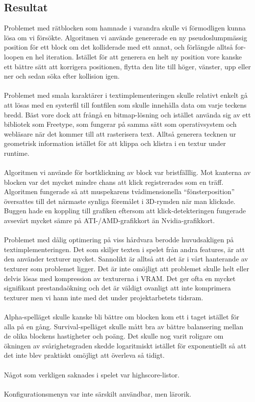 \documentclass[a4paper]{article}
\begin{document}
\subsection{Resultat}
Problemet med rätblocken som hamnade i varandra skulle vi förmodligen kunna lösa om vi försökte. Algoritmen vi använde genererade en ny pseudoslumpmässig position för ett block om det kolliderade med ett annat, och förlängde alltså for-loopen en hel iteration. Istället för att generera en helt ny position vore kanske ett bättre sätt att korrigera positionen, flytta den lite till höger, vänster, upp eller ner och sedan söka efter kollision igen.
\\
\\
Problemet med smala karaktärer i textimplementeringen skulle relativt enkelt gå att lösas med en systerfil till fontfilen som skulle innehålla data om varje teckens bredd. Bäst vore dock att frångå en bitmap-lösning och istället använda sig av ett bibliotek som Freetype, som fungerar på samma sätt som operativsystem och webläsare när det kommer till att rasterisera text. Alltså generera tecknen ur geometrisk information istället för att klippa och klistra i en textur under runtime.
\\
\\
Algoritmen vi använde för bortklickning av block var bristfälllig. Mot kanterna av blocken var det mycket mindre chans att klick registrerades som en träff. Algoritmen fungerade så att muspekarens tvådimensionella “fönsterposition” översattes till det närmaste synliga föremålet i 3D-rymden när man klickade. Buggen hade en koppling till grafiken eftersom att klick-detekteringen fungerade avsevärt mycket sämre på ATI-/AMD-grafikkort än Nvidia-grafikkort.
\\
\\
Problemet med dålig optimering på viss hårdvara berodde huvudsakligen på textimplementeringen. Det som skiljer texten i spelet från andra features, är att den använder texturer mycket. Sannolikt är alltså att det är i vårt hanterande av texturer som problemet ligger. Det är inte omöjligt att problemet skulle helt eller delvis lösas med kompression av texturerna i VRAM. Det ger ofta en mycket signifikant prestandaökning och det är väldigt ovanligt att inte komprimera texturer men vi hann inte med det under projektarbetets tidsram.
\\
\\
Alpha-spelläget skulle kanske bli bättre om blocken kom ett i taget istället för alla på en gång. Survival-spelläget skulle mått bra av bättre balansering mellan de olika blockens hastigheter och poäng. Det skulle nog varit roligare om ökningen av svårighetsgraden skedde logaritmiskt istället för exponentiellt så att det inte blev praktiskt omöjligt att överleva så tidigt.
\\
\\
Något som verkligen saknades i spelet var highscore-listor.
\\
\\
Konfigurationsmenyn var inte särskilt användbar, men lärorik.
\end{document}
